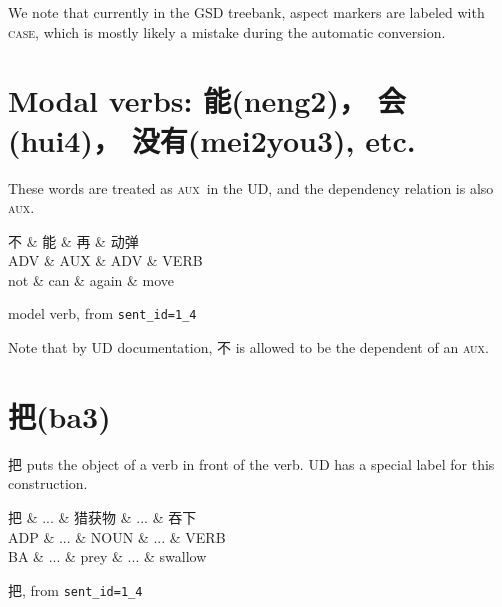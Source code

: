 \documentclass[UTF8,oneside]{book}
\def\aux{\textsc{aux}}
\begin{document}
We note that currently in the GSD treebank, aspect markers are labeled with \textsc{case}, which is mostly likely a mistake during the automatic conversion. 

\newpage
\section{Modal verbs: 能(neng2)， 会(hui4)， 没有(mei2you3), etc.}

These words are treated as \aux\ in the UD, and the dependency relation is also \aux.  

\begin{tree}[h]
\centering
\begin{dependency}[theme=simple]
\begin{deptext}[column sep=.5cm, row sep=.5ex]
不 \& 能  \& 再 \& 动弹 \\
ADV \& AUX \&  ADV \& VERB \\
not \& can \& again \& move \\
\end{deptext}
\end{dependency}
\caption{model verb, from \texttt{sent\_id=1\_4}}
\end{tree}

Note that by UD documentation, 不 is allowed to be the dependent of an \aux.

\newpage
\section{把(ba3)}

把 puts the object of a verb in front of the verb. UD has a special label for this construction. 

\begin{tree}[h]
\centering
\begin{dependency}[theme=simple]
\begin{deptext}[column sep=.5cm, row sep=.5ex]
把 \& ... \&  猎获物  \& ... \& 吞下 \\
ADP \& ... \& NOUN \&  ... \& VERB \\
BA \& ... \& prey \& ... \& swallow \\
\end{deptext}
\end{dependency}
\caption{把, from \texttt{sent\_id=1\_4}}
\end{tree}
\end{document}
